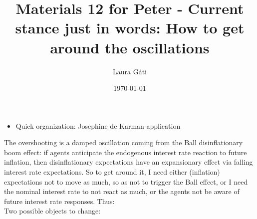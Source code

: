 \documentclass[11pt]{article}
\renewcommand{\[}{\begin{equation}}
\renewcommand{\]}{\end{equation}}
\begin{document}
\linespread{1.0}

\title{Materials 12 for Peter -
Current stance just in words: How to get around the oscillations }
\author{Laura G\'ati} 
\date{\today}
\maketitle



\begin{itemize}
\item Quick organization: Josephine de Karman application
\end{itemize}


The overshooting is a damped oscillation coming from the Ball disinflationary boom effect: if agents anticipate the endogenous interest rate reaction to future inflation, then disinflationary expectations have an expansionary effect via falling interest rate expectations. So to get around it, I need either (inflation) expectations not to move as much, so as not to trigger the Ball effect, or I need the nominal interest rate to not react as much, or the agents not be aware of future interest rate responses. Thus: \\
Two possible objects to change:
\end{document}
